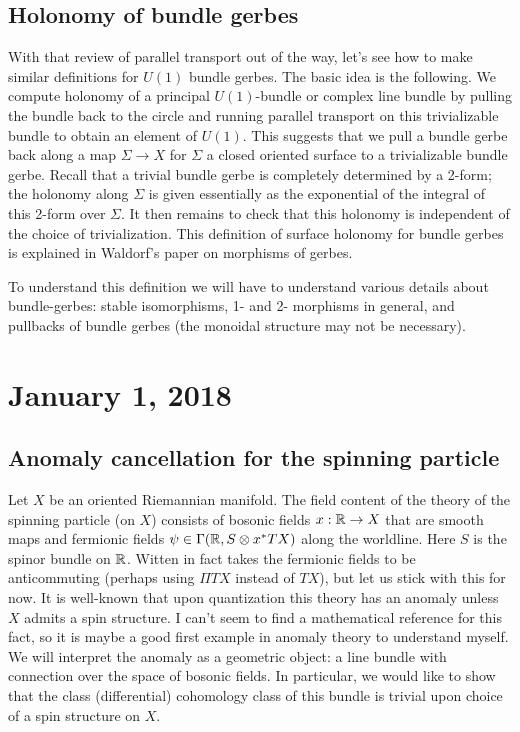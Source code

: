 \documentclass{amsart}
\begin{document}
\subsection{Holonomy of bundle gerbes}

With that review of parallel transport out of the way, let's see how to make
similar definitions for $U(1)$ bundle gerbes. The basic idea is the following.
We compute holonomy of a principal $U(1)$-bundle or complex line bundle by
pulling the bundle back to the circle and running parallel transport on this
trivializable bundle to obtain an element of $U(1)$.
This suggests that we pull a bundle gerbe back along
a map $\Sigma\to X$ for $\Sigma$ a closed oriented surface to a trivializable bundle gerbe.
Recall that a trivial bundle gerbe is completely determined by a 2-form; the
holonomy along $\Sigma$ is given essentially as the exponential of 
the integral of this 2-form over $\Sigma$. It then remains to check that this holonomy
is independent of the choice of trivialization.  This definition of surface
holonomy for bundle gerbes is explained in Waldorf's paper on morphisms of gerbes.

To understand this definition we will have to understand various details about
bundle-gerbes: stable isomorphisms, 1- and 2- morphisms in general, and pullbacks
of bundle gerbes (the monoidal structure may not be necessary).

\section{January 1, 2018}

\subsection{Anomaly cancellation for the spinning particle}

Let $X$ be an oriented Riemannian manifold. The field content of the theory of
the spinning particle (on $X$) consists of bosonic fields $x: \mathbb{R} \to X$ that are
smooth maps and fermionic fields $\psi\in\Gamma(\mathbb{R}, S\otimes x^*TX)$ along the
worldline. Here $S$ is the spinor bundle on $\mathbb{R}$. Witten in fact takes the
fermionic fields to be anticommuting (perhaps using $\Pi TX$ instead of $TX$),
but let us stick with this for now. It is well-known that upon quantization
this theory has an anomaly unless $X$ admits a spin structure. I can't seem to
find a mathematical reference for this fact, so it is maybe a good first example
in anomaly theory to understand myself. We will interpret the anomaly as a
geometric object: a line bundle with connection over the space of bosonic fields.
In particular, we would like to show that the class (differential) cohomology
class of this bundle is trivial upon choice of a spin structure on $X$.
\end{document}
